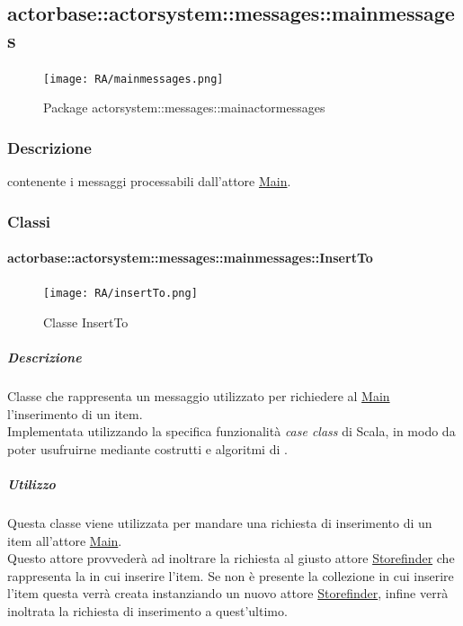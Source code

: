 \documentclass{scalatekids-article}
\begin{document}

\subsection{actorbase::actorsystem::messages::mainmessages}
\label{sec:actorbase::actorsystem::messages::mainmessages}

\begin{figure}[H]
  \begin{center}
    \texttt{[image: RA/mainmessages.png]}
    \caption{Package actorsystem::messages::mainactormessages}
  \end{center}
\end{figure}

\subsubsection{Descrizione}
 contenente i messaggi processabili dall'attore \hyperref[sec:actorbase::actorsystem::actors::main::Main]{Main}.

\subsubsection{Classi}

\paragraph{actorbase::actorsystem::messages::mainmessages::InsertTo}
\label{sec:actorbase::actorsystem::messages::mainmessages::InsertTo}

\begin{figure}[H]
  \begin{center}
    \texttt{[image: RA/insertTo.png]}
    \caption{Classe InsertTo}
  \end{center}
\end{figure}

\subparagraph{Descrizione}
Classe che rappresenta un messaggio utilizzato per richiedere al
\hyperref[sec:actorbase::actorsystem::actors::main::Main]{Main} l'inserimento
di un item.\\Implementata utilizzando la specifica funzionalità
\textit{case class} di Scala,
in modo da poter usufruirne mediante costrutti e algoritmi di
.

\subparagraph{Utilizzo}
Questa classe viene utilizzata per mandare una richiesta di inserimento di un
item all'attore
\hyperref[sec:actorbase::actorsystem::actors::main::Main]{Main}.\\Questo attore
provvederà ad inoltrare la richiesta al giusto attore
\hyperref[sec:actorbase::actorsystem::actors::storefinder::Storefinder]{Storefinder}
che rappresenta la  in cui inserire l'item. Se non è presente
la collezione in cui inserire l'item questa verrà creata instanziando un nuovo
attore
\hyperref[sec:actorbase::actorsystem::actors::storefinder::Storefinder]{Storefinder},
infine verrà inoltrata la richiesta di inserimento a quest'ultimo.
\end{document}
